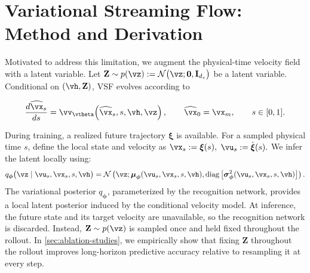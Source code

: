 \section{Variational Streaming Flow: Method and Derivation}
\label{sec:method}







Motivated to address this limitation, we augment the physical-time velocity field
with a latent variable. 
Let $ \mathbf{Z}
    \sim
    p(\vz)
    :=
    \mathcal N
    \bigl(
        \vz;
        \mathbf{0},
        \mathbf{I}_{d_z}
    \bigr)$  be a latent variable.  Conditional on $(\vh,\mathbf{Z})$, VSF evolves according to
\begin{tcolorbox}[
  colback=parchment,
  colframe=sandborder,
  boxrule=0.3pt,
  left=8pt,
  right=8pt,
  top=3pt,
  bottom=3pt
]
\begin{equation}
\frac{d\widehat{\vx}_s}{ds}
=
\vv_{\vtheta}\!\left(
    \widehat{\vx}_s,s,\vh,\vz
\right), \qquad \widehat{\vx}_0=\vx_m, 
\qquad s\in[0,1].
\label{eq:vsf_dynamics}
\end{equation}
\end{tcolorbox}


During training, a realized future trajectory $\boldsymbol{\xi}$ is available.
For a sampled physical time $s$, define the local state and velocity as
$\vx_s:=\boldsymbol{\xi}(s),$ $\vu_s:=\dot{\boldsymbol{\xi}}(s).$
We infer the latent locally using:
\begin{equation}
q_{\boldsymbol{\phi}}
\bigl(
\vz
\mid
\vu_s,
\vx_s,
s,
\vh
\bigr)
=
\mathcal N
\left(
\vz;
\boldsymbol{\mu}_{\boldsymbol{\phi}}
(\vu_s,\vx_s,s,\vh),
\operatorname{diag}
\left[
\boldsymbol{\sigma}_{\boldsymbol{\phi}}^2
(\vu_s,\vx_s,s,\vh)
\right]
\right).
\label{eq:vsf_variational_posterior}
\end{equation}
The variational posterior $q_{\boldsymbol{\phi}}$, parameterized by the
recognition network, provides a  
local latent posterior induced by the conditional velocity model.
At inference, the future state and
its target velocity are unavailable, so the recognition network is discarded.
Instead, $\mathbf{Z}\sim p(\vz)$ is sampled once and held fixed throughout
the rollout. In \cref{sec:ablation-studies}, we empirically show that fixing
$\mathbf{Z}$ throughout the rollout improves long-horizon predictive accuracy
relative to resampling it at every step.







